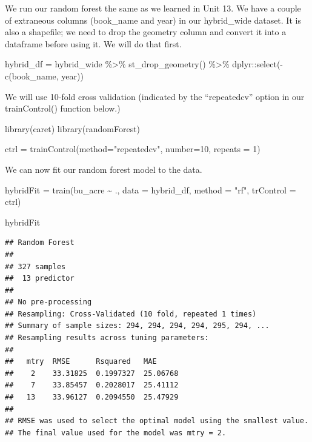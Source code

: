 \documentclass[
]{book}
\newenvironment{Shaded}{\begin{snugshade}}{\end{snugshade}}
\newcommand{\AttributeTok}[1]{\textcolor[rgb]{0.77,0.63,0.00}{#1}}
\newcommand{\DecValTok}[1]{\textcolor[rgb]{0.00,0.00,0.81}{#1}}
\newcommand{\FunctionTok}[1]{\textcolor[rgb]{0.00,0.00,0.00}{#1}}
\newcommand{\NormalTok}[1]{#1}
\newcommand{\OtherTok}[1]{\textcolor[rgb]{0.56,0.35,0.01}{#1}}
\newcommand{\SpecialCharTok}[1]{\textcolor[rgb]{0.00,0.00,0.00}{#1}}
\newcommand{\StringTok}[1]{\textcolor[rgb]{0.31,0.60,0.02}{#1}}
\begin{document}
We run our random forest the same as we learned in Unit 13. We have a couple of extraneous columns (book\_name and year) in our hybrid\_wide dataset. It is also a shapefile; we need to drop the geometry column and convert it into a dataframe before using it. We will do that first.

\begin{Shaded}
\begin{Highlighting}[]
\NormalTok{hybrid\_df }\OtherTok{=}\NormalTok{ hybrid\_wide }\SpecialCharTok{\%\textgreater{}\%}
  \FunctionTok{st\_drop\_geometry}\NormalTok{() }\SpecialCharTok{\%\textgreater{}\%}
\NormalTok{  dplyr}\SpecialCharTok{::}\FunctionTok{select}\NormalTok{(}\SpecialCharTok{{-}}\FunctionTok{c}\NormalTok{(book\_name, year))}
\end{Highlighting}
\end{Shaded}

We will use 10-fold cross validation (indicated by the ``repeatedcv'' option in our trainControl() function below.)

\begin{Shaded}
\begin{Highlighting}[]
\FunctionTok{library}\NormalTok{(caret)}
\FunctionTok{library}\NormalTok{(randomForest)}

\NormalTok{ctrl }\OtherTok{=} \FunctionTok{trainControl}\NormalTok{(}\AttributeTok{method=}\StringTok{"repeatedcv"}\NormalTok{, }\AttributeTok{number=}\DecValTok{10}\NormalTok{, }\AttributeTok{repeats =} \DecValTok{1}\NormalTok{)}
\end{Highlighting}
\end{Shaded}

We can now fit our random forest model to the data.

\begin{Shaded}
\begin{Highlighting}[]
\NormalTok{hybridFit }\OtherTok{=} \FunctionTok{train}\NormalTok{(bu\_acre }\SpecialCharTok{\textasciitilde{}}\NormalTok{ .,}
                \AttributeTok{data =}\NormalTok{ hybrid\_df,}
                \AttributeTok{method =} \StringTok{"rf"}\NormalTok{,}
                \AttributeTok{trControl =}\NormalTok{ ctrl)}

\NormalTok{hybridFit}
\end{Highlighting}
\end{Shaded}

\begin{verbatim}
## Random Forest 
## 
## 327 samples
##  13 predictor
## 
## No pre-processing
## Resampling: Cross-Validated (10 fold, repeated 1 times) 
## Summary of sample sizes: 294, 294, 294, 294, 295, 294, ... 
## Resampling results across tuning parameters:
## 
##   mtry  RMSE      Rsquared   MAE     
##    2    33.31825  0.1997327  25.06768
##    7    33.85457  0.2028017  25.41112
##   13    33.96127  0.2094550  25.47929
## 
## RMSE was used to select the optimal model using the smallest value.
## The final value used for the model was mtry = 2.
\end{verbatim}
\end{document}
